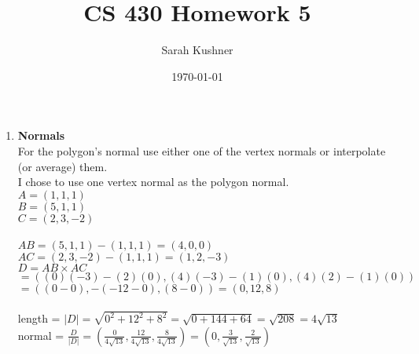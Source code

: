 \documentclass[12pt]{article}
\begin{document}
\title{CS 430 Homework 5}
\author{Sarah Kushner}
\date{\today}
\maketitle

\begin{enumerate}

\item 
\textbf{Normals} \\

For the polygon’s normal use either one of the vertex normals or interpolate (or average) them. \\
I chose to use one vertex normal as the polygon normal. \\

$A = (1,1,1)$ \\
$B = (5,1,1)$ \\
$C = (2,3,-2)$ \\ \\

$AB = (5,1,1) - (1,1,1) = (4,0,0)$ \\
$AC = (2,3,-2) - (1,1,1) = (1,2,-3)$ \\

$D = AB \times AC$ \\
$ = ( (0)(-3)-(2)(0), (4)(-3)-(1)(0), (4)(2)-(1)(0) )$ \\
$ = ( (0 - 0), -(-12 - 0), (8 - 0) ) = (0, 12, 8)$ \\ \\

length = $\lvert D \rvert = \sqrt{0^2 + 12^2 + 8^2} = \sqrt{0+144+64} = \sqrt{208} = 4\sqrt{13}$ \\

normal = $\frac{D}{\lvert D \rvert} = (\frac{0}{4\sqrt{13}}, \frac{12}{4\sqrt{13}}, \frac{8}{4\sqrt{13}}) = (0, \frac{3}{\sqrt{13}}, \frac{2}{\sqrt{13}}) $

\end{enumerate}
\end{document}

